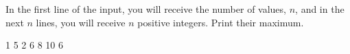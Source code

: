 




In the first line of the input, you will receive the number of values, $n$, and in the next $n$ lines, you will receive $n$ positive integers. Print their maximum.

1
5
2
6
8
10
6
\koniec

